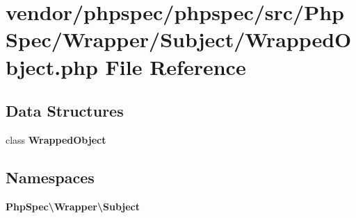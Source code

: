 \section{vendor/phpspec/phpspec/src/\+Php\+Spec/\+Wrapper/\+Subject/\+Wrapped\+Object.php File Reference}
\label{_wrapped_object_8php}
\subsection*{Data Structures}
\begin{DoxyCompactItemize}
\item 
class {\bf Wrapped\+Object}
\end{DoxyCompactItemize}
\subsection*{Namespaces}
\begin{DoxyCompactItemize}
\item 
 {\bf Php\+Spec\textbackslash{}\+Wrapper\textbackslash{}\+Subject}
\end{DoxyCompactItemize}
